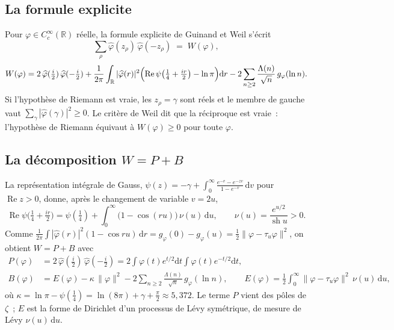 \documentclass[11pt,a4paper]{article}
\theoremstyle{definition}
\theoremstyle{remark}
\newcommand{\R}{\mathbb{R}}
\newcommand{\dd}{\mathrm{d}}
\DeclareMathOperator{\re}{Re}
\DeclareMathOperator{\sh}{sh}
\begin{document}
\subsection*{La formule explicite}
Pour $\varphi\in C_c^\infty(\R)$ réelle, la formule explicite de Guinand et Weil \cite{weil,bombieri} s'écrit
\begin{equation}\label{eq:explicite}
\sum_\rho \widehat\varphi(z_\rho)\,\widehat\varphi(-z_\rho)\;=\;W(\varphi),
\end{equation}
\begin{equation}\label{eq:W}
W(\varphi)=2\,\widehat\varphi(\tfrac i2)\,\widehat\varphi(-\tfrac i2)
+\frac1{2\pi}\int_{\R}|\widehat\varphi(r)|^2\Bigl(\re\psi\bigl(\tfrac14+\tfrac{ir}2\bigr)-\ln\pi\Bigr)\dd r
-2\sum_{n\ge2}\frac{\Lambda(n)}{\sqrt n}\,g_\varphi(\ln n).
\end{equation}
Si l'hypothèse de Riemann est vraie, les $z_\rho=\gamma$ sont réels et le membre de gauche vaut
$\sum_\gamma|\widehat\varphi(\gamma)|^2\ge0$. Le critère de Weil dit que la réciproque est vraie~: l'hypothèse de Riemann
équivaut à $W(\varphi)\ge0$ pour toute $\varphi$.

\subsection*{La décomposition $W=P+B$}
La représentation intégrale de Gauss, $\psi(z)=-\gamma+\int_0^\infty\frac{e^{-v}-e^{-zv}}{1-e^{-v}}\,\dd v$ pour $\re z>0$, donne, après
le changement de variable $v=2u$,
\begin{equation}\label{eq:levy}
\re\psi\bigl(\tfrac14+\tfrac{ir}2\bigr)=\psi(\tfrac14)+\int_0^\infty\bigl(1-\cos(ru)\bigr)\,\nu(u)\,\dd u,
\qquad \nu(u)=\frac{e^{u/2}}{\sh u}>0 .
\end{equation}
Comme $\frac1{2\pi}\int|\widehat\varphi(r)|^2(1-\cos ru)\,\dd r=g_\varphi(0)-g_\varphi(u)=\tfrac12\|\varphi-\tau_u\varphi\|^2$, on obtient
$W=P+B$ avec
\begin{align}
P(\varphi)&=2\,\widehat\varphi(\tfrac i2)\,\widehat\varphi(-\tfrac i2)
=2\int\varphi(t)e^{t/2}\dd t\int\varphi(t)e^{-t/2}\dd t,\label{eq:P}\\
B(\varphi)&=E(\varphi)-\kappa\,\|\varphi\|^2-2\sum_{n\ge2}\frac{\Lambda(n)}{\sqrt n}\,g_\varphi(\ln n),\qquad
E(\varphi)=\frac12\int_0^\infty\|\varphi-\tau_u\varphi\|^2\,\nu(u)\,\dd u,\label{eq:B}
\end{align}
où $\kappa=\ln\pi-\psi(\tfrac14)=\ln(8\pi)+\gamma+\tfrac\pi2\approx5{,}372$. Le terme $P$ vient des pôles de $\zeta$~; $E$ est la
forme de Dirichlet d'un processus de Lévy symétrique, de mesure de Lévy $\nu(u)\,\dd u$.
\end{document}
